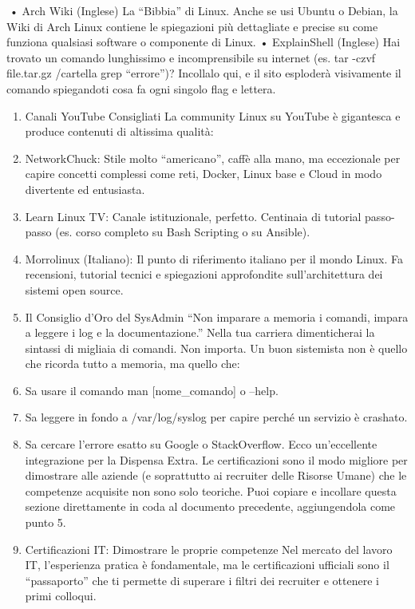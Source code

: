 \documentclass[11pt,a4paper]{article}
\begin{document}
• Arch Wiki (Inglese) La ``Bibbia'' di Linux. Anche se usi Ubuntu o
Debian, la Wiki di Arch Linux contiene le spiegazioni più dettagliate e
precise su come funziona qualsiasi software o componente di Linux. •
ExplainShell (Inglese) Hai trovato un comando lunghissimo e
incomprensibile su internet (es. tar -czvf file.tar.gz /cartella
\textbar{} grep ``errore'')? Incollalo qui, e il sito esploderà
visivamente il comando spiegandoti cosa fa ogni singolo flag e lettera.

\begin{enumerate}
\def\labelenumi{\arabic{enumi}.}
\setcounter{enumi}{2}
\item
  Canali YouTube Consigliati La community Linux su YouTube è gigantesca
  e produce contenuti di altissima qualità:
\item
  NetworkChuck: Stile molto ``americano'', caffè alla mano, ma
  eccezionale per capire concetti complessi come reti, Docker, Linux
  base e Cloud in modo divertente ed entusiasta.
\item
  Learn Linux TV: Canale istituzionale, perfetto. Centinaia di tutorial
  passo-passo (es. corso completo su Bash Scripting o su Ansible).
\item
  Morrolinux (Italiano): Il punto di riferimento italiano per il mondo
  Linux. Fa recensioni, tutorial tecnici e spiegazioni approfondite
  sull'architettura dei sistemi open source.
\item
  Il Consiglio d'Oro del SysAdmin ``Non imparare a memoria i comandi,
  impara a leggere i log e la documentazione.'' Nella tua carriera
  dimenticherai la sintassi di migliaia di comandi. Non importa. Un buon
  sistemista non è quello che ricorda tutto a memoria, ma quello che:
\item
  Sa usare il comando man {[}nome\_comando{]} o --help.
\item
  Sa leggere in fondo a /var/log/syslog per capire perché un servizio è
  crashato.
\item
  Sa cercare l'errore esatto su Google o StackOverflow. Ecco
  un'eccellente integrazione per la Dispensa Extra. Le certificazioni
  sono il modo migliore per dimostrare alle aziende (e soprattutto ai
  recruiter delle Risorse Umane) che le competenze acquisite non sono
  solo teoriche. Puoi copiare e incollare questa sezione direttamente in
  coda al documento precedente, aggiungendola come punto 5.
\item
  Certificazioni IT: Dimostrare le proprie competenze Nel mercato del
  lavoro IT, l'esperienza pratica è fondamentale, ma le certificazioni
  ufficiali sono il ``passaporto'' che ti permette di superare i filtri
  dei recruiter e ottenere i primi colloqui.
\end{enumerate}
\end{document}
